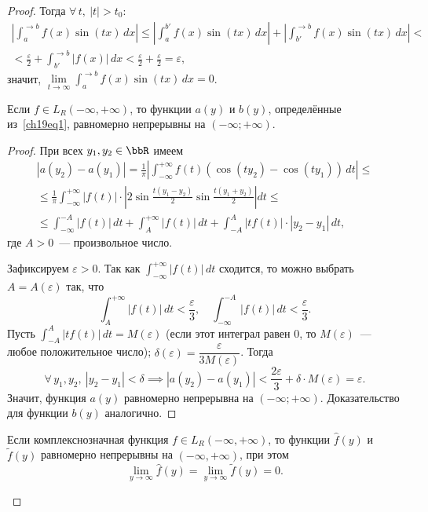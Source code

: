 \begin{proof}
Тогда $\forall\, t,\ |t| > t_0$:
\begin{multline*}
\left| \int_{a}^{\to b} f(x)\sin(tx)\,dx \right|
\le \left| \int_{a}^{b'} f(x)\sin(tx)\,dx \right|
  + \left| \int_{b'}^{\to b} f(x)\sin(tx)\,dx \right| < \\
< \frac{\varepsilon}{2} + \int_{b'}^{\to b}|f(x)|\,dx
< \frac{\varepsilon}{2} + \frac{\varepsilon}{2} = \varepsilon,
\end{multline*}
значит, $\lim\limits_{t \to \infty} \int_a^{\to b} f(x)\sin(tx)\,dx = 0$.

\begin{lemm}
\label{lm25:1}
Если $f \in L_R(-\infty, +\infty)$, то функции $a(y)$ и $b(y)$, определённые из~\eqref{ch19eq1}, равномерно непрерывны на $(-\infty; +\infty)$.
\end{lemm}

\begin{proof}
При всех $y_1, y_2 \in \bbR$ имеем
\begin{multline*}
|a(y_2) - a(y_1)|
= \frac{1}{\pi}\left| \int_{-\infty}^{+\infty} f(t)(\cos(ty_2) - \cos(ty_1))\,dt \right| \le \\
\le \frac{1}{\pi} \int_{-\infty}^{+\infty} |f(t)| \cdot 
\left| 2\sin\frac{t(y_1 - y_2)}{2} \sin\frac{t(y_1 + y_2)}{2} \right| dt \le \\
\le \int_{-\infty}^{-A} |f(t)|\,dt + \int_{A}^{+\infty} |f(t)|\,dt
  + \int_{-A}^{A} |tf(t)| \cdot |y_2 - y_1|\,dt,
\end{multline*}
где $A > 0$~--- произвольное число.

Зафиксируем $\varepsilon > 0$. Так как $\int_{-\infty}^{+\infty}|f(t)|\,dt$ сходится, то можно выбрать $A = A(\varepsilon)$ так, что
$$
\int_{A}^{+\infty}|f(t)|\,dt < \frac{\varepsilon}{3}, \quad
\int_{-\infty}^{-A}|f(t)|\,dt < \frac{\varepsilon}{3}.
$$
Пусть $\int_{-A}^{A}|tf(t)|\,dt = M(\varepsilon)$ (если этот интеграл равен $0$, то $M(\varepsilon)$~--- любое положительное число); $\delta(\varepsilon) = \dfrac{\varepsilon}{3M(\varepsilon)}$. Тогда
$$
\forall\, y_1, y_2,\ |y_2 - y_1| < \delta \implies
|a(y_2) - a(y_1)| < \frac{2\varepsilon}{3} + \delta \cdot M(\varepsilon) = \varepsilon.
$$
Значит, функция $a(y)$ равномерно непрерывна на $(-\infty; +\infty)$. Доказательство для функции $b(y)$ аналогично.
\end{proof}

\begin{thm}
\label{th25:4}
Если комплекснозначная функция $f \in L_R(-\infty, +\infty)$, то функции $\widehat{f}(y)$ и $\widetilde{f}(y)$ равномерно непрерывны на $(-\infty, +\infty)$, при этом
$$
\lim_{y \to \infty} \widehat{f}(y) = \lim_{y \to \infty} \widetilde{f}(y) = 0.
$$
\end{thm}


\end{proof}
